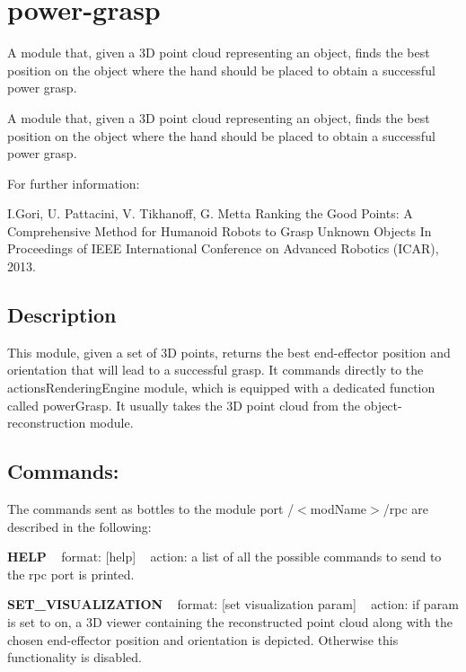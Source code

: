 \section{power-\/grasp}
\label{group__power-grasp}


A module that, given a 3D point cloud representing an object, finds the best position on the object where the hand should be placed to obtain a successful power grasp.  


A module that, given a 3D point cloud representing an object, finds the best position on the object where the hand should be placed to obtain a successful power grasp. 

For further information\+:

I.\+Gori, U. Pattacini, V. Tikhanoff, G. Metta Ranking the Good Points\+: A Comprehensive Method for Humanoid Robots to Grasp Unknown Objects In Proceedings of I\+E\+EE International Conference on Advanced Robotics (I\+C\+AR), 2013.\hypertarget{group__handIKModule_intro_sec}{}\subsection{Description}\label{group__handIKModule_intro_sec}
This module, given a set of 3D points, returns the best end-\/effector position and orientation that will lead to a successful grasp. It commands directly to the actions\+Rendering\+Engine module, which is equipped with a dedicated function called power\+Grasp. It usually takes the 3D point cloud from the object-\/reconstruction module.\hypertarget{group__handIKModule_rpc_port}{}\subsection{Commands\+:}\label{group__handIKModule_rpc_port}
The commands sent as bottles to the module port /$<$mod\+Name$>$/rpc are described in the following\+:

{\bfseries H\+E\+LP} ~\newline
format\+: \mbox{[}help\mbox{]} ~\newline
action\+: a list of all the possible commands to send to the rpc port is printed.

{\bfseries S\+E\+T\+\_\+\+V\+I\+S\+U\+A\+L\+I\+Z\+A\+T\+I\+ON} ~\newline
format\+: \mbox{[}set visualization param\mbox{]} ~\newline
action\+: if param is set to on, a 3D viewer containing the reconstructed point cloud along with the chosen end-\/effector position and orientation is depicted. Otherwise this functionality is disabled.

